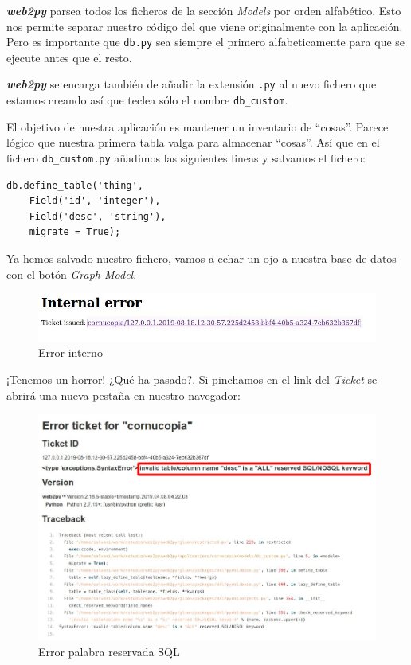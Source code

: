 \documentclass[
  12pt,
  spanish,
]{article}
\begin{document}
\textbf{\emph{web2py}} parsea todos los ficheros de la sección
\emph{Models} por orden alfabético. Esto nos permite separar nuestro
código del que viene originalmente con la aplicación. Pero es importante
que \texttt{db.py} sea siempre el primero alfabeticamente para que se
ejecute antes que el resto.

\textbf{\emph{web2py}} se encarga también de añadir la extensión
\texttt{.py} al nuevo fichero que estamos creando así que teclea sólo el
nombre \texttt{db\_custom}.

El objetivo de nuestra aplicación es mantener un inventario de
``cosas''. Parece lógico que nuestra primera tabla valga para almacenar
``cosas''. Así que en el fichero \texttt{db\_custom.py} añadimos las
siguientes lineas y salvamos el fichero:

\begin{verbatim}
db.define_table('thing',
    Field('id', 'integer'),
    Field('desc', 'string'),
    migrate = True);
\end{verbatim}

Ya hemos salvado nuestro fichero, vamos a echar un ojo a nuestra base de
datos con el botón \emph{Graph Model}.

\begin{figure}
\centering
\includegraphics{src/img/internal_error.jpg}
\caption{Error interno}
\end{figure}

¡Tenemos un horror! ¿Qué ha pasado?. Si pinchamos en el link del
\emph{Ticket} se abrirá una nueva pestaña en nuestro navegador:

\begin{figure}
\centering
\includegraphics{src/img/error_reserved_sql.jpg}
\caption{Error palabra reservada SQL}
\end{figure}
\end{document}
